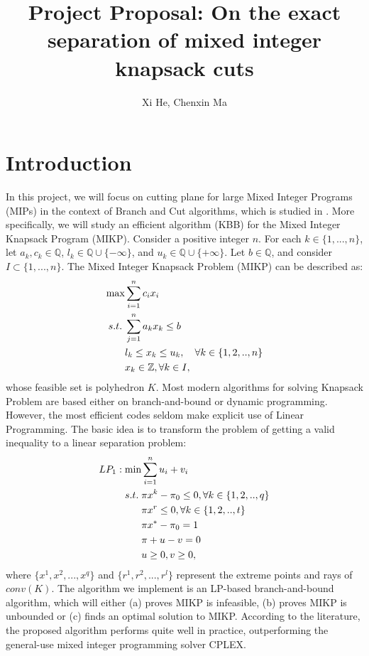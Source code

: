 \documentclass[a4paper,10pt]{article}
\title{Project Proposal: On the exact separation of mixed integer knapsack cuts}
\author{Xi He, Chenxin Ma}
\begin{document}
\maketitle
 
\section{Introduction} 

In this project, we will focus on cutting plane for large Mixed Integer Programs (MIPs) in the context of Branch and Cut algorithms, which is studied in \cite{fukasawa2011exact}. More specifically, we will study an efficient algorithm (KBB) for the Mixed Integer Knapsack Program (MIKP). 
Consider a positive integer $n$. For each $k\in\{1,...,n\}$, let $a_k, c_k\in \mathbb Q$, $l_k\in \mathbb Q\cup \{-\infty\}$, and $u_k\in \mathbb Q\cup \{+\infty\}$. Let $b\in\mathbb Q$, and consider $I\subset \{1,...,n\}$. The Mixed Integer Knapsack Problem (MIKP) can be described as:
\begin{align}
\max &\sum_{i=1}^{n}c_ix_i \notag\\
s.t. \; &\sum_{j=1}^{n} a_{k}x_k\leq b \notag\\
&l_k\leq x_k\leq u_k,\quad\forall k\in\{1,2,..,n\} \notag\\
&x_k\in \mathbb Z, \forall k\in I,
\end{align} 
whose feasible set is polyhedron $K$. Most modern algorithms for solving Knapsack Problem are based either on branch-and-bound or dynamic programming. However, the most efficient codes seldom make explicit use of Linear Programming.  The basic idea is to transform the problem of getting a valid inequality to a linear separation problem:
\begin{align}
LP_1: \min &\sum_{i=1}^{n} u_i+v_i \notag\\
s.t. \;  & \pi x^k-\pi_0\leq 0,  \forall k\in\{1,2,..,q\} \notag\\
& \pi x^r\leq 0, \forall  k\in\{1,2,..,t\} \notag\\
& \pi x^*-\pi_0 = 1 \notag\\
& \pi+u-v = 0 \notag\\
&u\geq 0, v\geq 0\notag,
\end{align}
where $\{x^1, x^2,...,x^q\}$ and $\{r^1,r^2,..., r^l\}$ represent the extreme points and rays of $conv(K)$. The algorithm we implement is an LP-based branch-and-bound algorithm,  which will either (a) proves MIKP is infeasible, (b) proves MIKP is unbounded or (c) finds an optimal solution to MIKP. According to the literature, the proposed algorithm performs quite well in practice, outperforming the general-use mixed integer programming solver CPLEX. 
\end{document}

